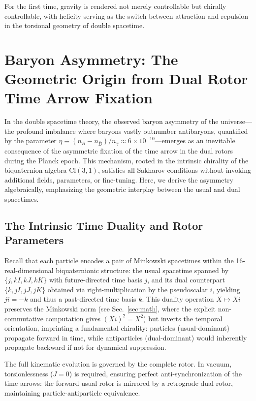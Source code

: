 \documentclass[dvipdfmx,a4paper]{article}
\begin{document}
For the first time, gravity is rendered not merely controllable but chirally controllable, with helicity serving as the switch between attraction and repulsion in the torsional geometry of double spacetime.

\section{Baryon Asymmetry: The Geometric Origin from Dual Rotor Time Arrow Fixation}
\label{sec:baryonasymmetry}

In the double spacetime theory, the observed baryon asymmetry of the universe---the profound imbalance where baryons vastly outnumber antibaryons, quantified by the parameter $\eta \equiv (n_B - n_{\bar{B}})/n_\gamma \approx 6 \times 10^{-10}$---emerges as an inevitable consequence of the asymmetric fixation of the time arrow in the dual rotors during the Planck epoch. This mechanism, rooted in the intrinsic chirality of the biquaternion algebra $\mathrm{Cl}(3,1)$, satisfies all Sakharov conditions without invoking additional fields, parameters, or fine-tuning. Here, we derive the asymmetry algebraically, emphasizing the geometric interplay between the usual and dual spacetimes.

\subsection{The Intrinsic Time Duality and Rotor Parameters}

Recall that each particle encodes a pair of Minkowski spacetimes within the 16-real-dimensional biquaternionic structure: the usual spacetime spanned by $\{j, kI, kJ, kK\}$ with future-directed time basis $j$, and its dual counterpart $\{k, jI, jJ, jK\}$ obtained via right-multiplication by the pseudoscalar $i$, yielding $j i = -k$ and thus a past-directed time basis $k$. This duality operation $X \mapsto X i$ preserves the Minkowski norm (see Sec.~\ref{sec:math}, where the explicit non-commutative computation gives $(X i)^2 = X^2$) but inverts the temporal orientation, imprinting a fundamental chirality: particles (usual-dominant) propagate forward in time, while antiparticles (dual-dominant) would inherently propagate backward if not for dynamical suppression.

The full kinematic evolution is governed by the complete rotor. In vacuum, torsionlessness ($J=0$) is required, ensuring perfect anti-synchronization of the time arrows: the forward usual rotor is mirrored by a retrograde dual rotor, maintaining particle-antiparticle equivalence.
\end{document}
